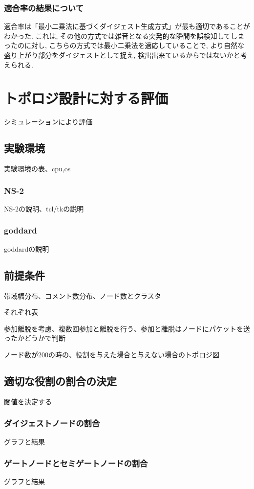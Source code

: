 \subsubsection{適合率の結果について}
適合率は「最小二乗法に基づくダイジェスト生成方式」が最も適切であることがわかった. これは, その他の方式では雑音となる突発的な瞬間を誤検知してしまったのに対し, こちらの方式では最小二乗法を適応していることで, より自然な盛り上がり部分をダイジェストとして捉え, 検出出来ているからではないかと考えられる.

\section{トポロジ設計に対する評価}
シミュレーションにより評価

\subsection{実験環境}
実験環境の表、cpu,os

\subsubsection{NS-2}
NS-2の説明、tcl/tkの説明

\subsubsection{goddard}
goddardの説明

\subsection{前提条件}
帯域幅分布、コメント数分布、ノード数とクラスタ

それぞれ表

参加離脱を考慮、複数回参加と離脱を行う、参加と離脱はノードにパケットを送ったかどうかで判断

ノード数が200の時の、役割を与えた場合と与えない場合のトポロジ図

\subsection{適切な役割の割合の決定}
閾値を決定する

\subsubsection{ダイジェストノードの割合}
グラフと結果

\subsubsection{ゲートノードとセミゲートノードの割合}
グラフと結果

